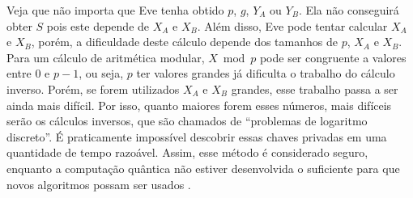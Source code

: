 Veja que não importa que Eve tenha obtido $p$, $g$, $Y_{A}$ ou $Y_{B}$. Ela não
conseguirá obter $S$ pois este depende de $X_{A}$ e $X_{B}$. Além disso, Eve pode
tentar calcular $X_{A}$ e $X_{B}$, porém, a dificuldade deste cálculo depende dos
tamanhos de $p$, $X_{A}$ e $X_{B}$. Para um cálculo de aritmética modular, $X \bmod p$
pode ser congruente a valores entre 0 e $p-1$, ou seja, $p$ ter valores grandes já
dificulta o trabalho do cálculo inverso. Porém, se forem utilizados $X_{A}$ e $X_{B}$
grandes, esse trabalho passa a ser ainda mais difícil. Por isso, quanto maiores forem
esses números, mais difíceis serão os cálculos inversos, que são chamados de
``problemas de logaritmo discreto''. É praticamente impossível descobrir essas chaves
privadas em uma quantidade de tempo razoável. Assim, esse método é considerado seguro,
enquanto a computação quântica não estiver desenvolvida o suficiente para que novos
algoritmos possam ser usados \cite{artigo:shor}.